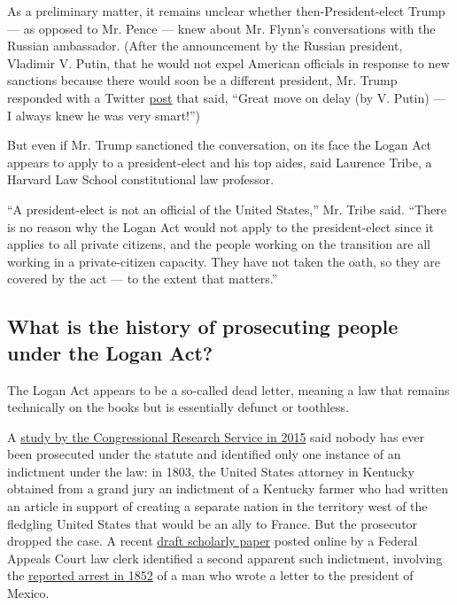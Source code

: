 As a preliminary matter, it remains unclear whether then-President-elect
Trump --- as opposed to Mr. Pence --- knew about Mr. Flynn's
conversations with the Russian ambassador. (After the announcement by
the Russian president, Vladimir V. Putin, that he would not expel
American officials in response to new sanctions because there would soon
be a different president, Mr. Trump responded with a Twitter
\href{https://twitter.com/realDonaldTrump/status/814919370711461890?ref_src=twsrc\%5Etfw}{post}
that said, ``Great move on delay (by V. Putin) --- I always knew he was
very smart!'')

But even if Mr. Trump sanctioned the conversation, on its face the Logan
Act appears to apply to a president-elect and his top aides, said
Laurence Tribe, a Harvard Law School constitutional law professor.

``A president-elect is not an official of the United States,'' Mr. Tribe
said. ``There is no reason why the Logan Act would not apply to the
president-elect since it applies to all private citizens, and the people
working on the transition are all working in a private-citizen capacity.
They have not taken the oath, so they are covered by the act --- to the
extent that matters.''

\hypertarget{what-is-the-history-of-prosecuting-people-under-the-logan-act}{%
\subsection{What is the history of prosecuting people under the Logan
Act?}\label{what-is-the-history-of-prosecuting-people-under-the-logan-act}}

The Logan Act appears to be a so-called dead letter, meaning a law that
remains technically on the books but is essentially defunct or
toothless.

A \href{https://fas.org/sgp/crs/misc/RL33265.pdf}{study by the
Congressional Research Service in 2015} said nobody has ever been
prosecuted under the statute and identified only one instance of an
indictment under the law: in 1803, the United States attorney in
Kentucky obtained from a grand jury an indictment of a Kentucky farmer
who had written an article in support of creating a separate nation in
the territory west of the fledgling United States that would be an ally
to France. But the prosecutor dropped the case. A recent
\href{https://poseidon01.ssrn.com/delivery.php?ID=224027017022099121070082026090107120034088085082033007113020114000022115104107023106005038115104046010035023078005096096027102121014024022061107126079029078089015087036049055088087120014001126002121007071106124122018031070093097075101077115022073103030\&EXT=pdf}{draft
scholarly paper} posted online by a Federal Appeals Court law clerk
identified a second apparent such indictment, involving the
\href{http://query.nytimes.com/mem/archive-free/pdf?res=9406E4DB1331E234BC4D53DFB4668389649FDE}{reported
arrest in 1852} of a man who wrote a letter to the president of Mexico.

